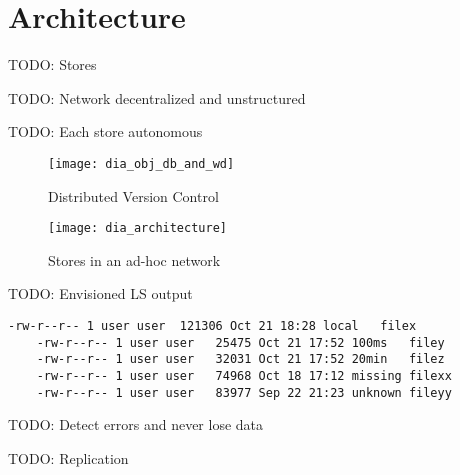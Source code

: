 \chapter{Architecture}

TODO: Stores

TODO: Network decentralized and unstructured

TODO: Each store autonomous

\begin{figure}[h!]
  \caption{Distributed Version Control}
  \label{fig:dia_obj_db_and_wd}
  \centering
    \texttt{[image: dia\_obj\_db\_and\_wd]}
\end{figure}

\begin{figure}[h]
  \caption{Stores in an ad-hoc network}
  \label{fig:dia_architecture}
  \centering
    \texttt{[image: dia\_architecture]}
\end{figure}

TODO: Envisioned LS output

\begin{lstlisting}[caption=Example ls output]
    -rw-r--r-- 1 user user  121306 Oct 21 18:28 local   filex
    -rw-r--r-- 1 user user   25475 Oct 21 17:52 100ms   filey
    -rw-r--r-- 1 user user   32031 Oct 21 17:52 20min   filez
    -rw-r--r-- 1 user user   74968 Oct 18 17:12 missing filexx
    -rw-r--r-- 1 user user   83977 Sep 22 21:23 unknown fileyy
\end{lstlisting}

TODO: Detect errors and never lose data

TODO: Replication
